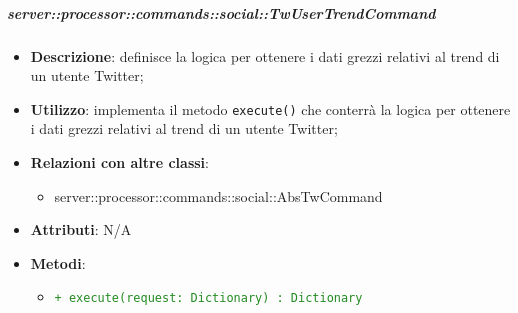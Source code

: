         \subparagraph{server::processor::commands::social::TwUserTrendCommand} %
        \label{subp:bdsm_app_server_processor_commands_social_twusertrendcommand}
        \begin{itemize}
          \item \textbf{Descrizione}: definisce la logica per ottenere i dati grezzi relativi al trend di un utente Twitter;
          \item \textbf{Utilizzo}: implementa il metodo \texttt{execute()} che conterrà la logica per ottenere i dati grezzi relativi al trend di un utente Twitter;
          \item \textbf{Relazioni con altre classi}:
            \begin{itemize}
              \item server::processor::commands::social::AbsTwCommand
            \end{itemize}
          \item \textbf{Attributi}: N/A
          \item \textbf{Metodi}:
          \begin{itemize}
              \item \textcolor{forestgreen}{\texttt{+ execute(request: Dictionary) : Dictionary}}
          \end{itemize}
        \end{itemize}

